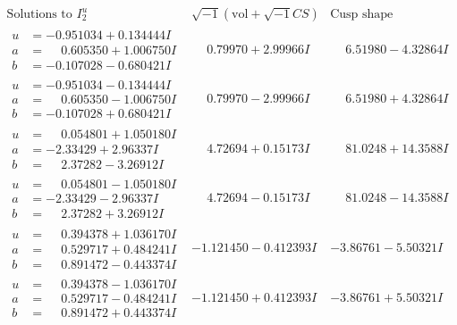 \documentclass[1p]{elsarticle_modified}
\theoremstyle{definition}
\newcommand{\I}{\sqrt{-1}}
\begin{document}
$$\begin{array}{c|c|c}  
\text{Solutions to }I^u_{2}& \I (\text{vol} + \sqrt{-1}CS) & \text{Cusp shape}\\
 \hline 
\begin{aligned}
u &= -0.951034 + 0.134444 I \\
a &= \phantom{-}0.605350 + 1.006750 I \\
b &= -0.107028 - 0.680421 I\end{aligned}
 & \phantom{-}0.79970 + 2.99966 I & \phantom{-}6.51980 - 4.32864 I \\ \hline\begin{aligned}
u &= -0.951034 - 0.134444 I \\
a &= \phantom{-}0.605350 - 1.006750 I \\
b &= -0.107028 + 0.680421 I\end{aligned}
 & \phantom{-}0.79970 - 2.99966 I & \phantom{-}6.51980 + 4.32864 I \\ \hline\begin{aligned}
u &= \phantom{-}0.054801 + 1.050180 I \\
a &= -2.33429 + 2.96337 I \\
b &= \phantom{-}2.37282 - 3.26912 I\end{aligned}
 & \phantom{-}4.72694 + 0.15173 I & \phantom{-}81.0248 + 14.3588 I \\ \hline\begin{aligned}
u &= \phantom{-}0.054801 - 1.050180 I \\
a &= -2.33429 - 2.96337 I \\
b &= \phantom{-}2.37282 + 3.26912 I\end{aligned}
 & \phantom{-}4.72694 - 0.15173 I & \phantom{-}81.0248 - 14.3588 I \\ \hline\begin{aligned}
u &= \phantom{-}0.394378 + 1.036170 I \\
a &= \phantom{-}0.529717 + 0.484241 I \\
b &= \phantom{-}0.891472 - 0.443374 I\end{aligned}
 & -1.121450 - 0.412393 I & -3.86761 - 5.50321 I \\ \hline\begin{aligned}
u &= \phantom{-}0.394378 - 1.036170 I \\
a &= \phantom{-}0.529717 - 0.484241 I \\
b &= \phantom{-}0.891472 + 0.443374 I\end{aligned}
 & -1.121450 + 0.412393 I & -3.86761 + 5.50321 I \\ \hline\begin{aligned}

\end{aligned}
\end{array}$$
\end{document}
